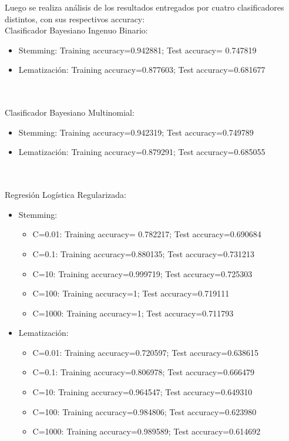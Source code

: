 \documentclass[letter, 10pt]{article}
\begin{document}
Luego se realiza análisis de los resultados entregados por cuatro clasificadores distintos, con sus respectivos accuracy:\\
Clasificador Bayesiano Ingenuo Binario:
\begin{itemize}
  \item Stemming: Training accuracy=0.942881; Test accuracy= 0.747819
  \item Lematización: Training accuracy=0.877603; Test accuracy=0.681677
\end{itemize}
\\\\
Clasificador Bayesiano Multinomial:
\begin{itemize}
  \item Stemming: Training accuracy=0.942319; Test accuracy=0.749789
  \item Lematización: Training accuracy=0.879291; Test accuracy=0.685055
\end{itemize}
\\\\
Regresión Logística Regularizada:
\begin{itemize}
  \item Stemming: 
  \begin{itemize}
    \item C=0.01: Training accuracy= 0.782217; Test accuracy=0.690684
    \item C=0.1: Training accuracy=0.880135; Test accuracy=0.731213
    \item C=10: Training accuracy=0.999719; Test accuracy=0.725303
    \item C=100: Training accuracy=1; Test accuracy=0.719111
    \item C=1000: Training accuracy=1; Test accuracy=0.711793
  \end{itemize}
  \item Lematización: 
    \begin{itemize}
    \item C=0.01: Training accuracy=0.720597; Test accuracy=0.638615
    \item C=0.1: Training accuracy=0.806978; Test accuracy=0.666479
    \item C=10: Training accuracy=0.964547; Test accuracy=0.649310
    \item C=100: Training accuracy=0.984806; Test accuracy=0.623980
    \item C=1000: Training accuracy=0.989589; Test accuracy=0.614692
  \end{itemize}
\end{itemize}
\end{document}

